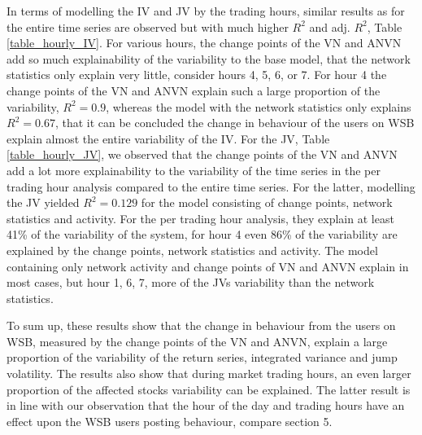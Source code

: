 In terms of modelling the IV and JV by the trading hours, similar results as for the entire time series are observed but with much higher $R^2$ and adj. $R^2$, Table \ref{table_hourly_IV}. For various hours, the change points of the VN and ANVN add so much explainability of the variability to the base model, that the network statistics only explain very little, consider hours 4, 5, 6, or 7. For hour 4 the change points of the VN and ANVN explain such a large proportion of the variability, $R^2 = 0.9$, whereas the model with the network statistics only explains $R^2 = 0.67$, that it can be concluded the change in behaviour of the users on WSB explain almost the entire variability of the IV. 
For the JV, Table \ref{table_hourly_JV}, we observed that the change points of the VN and ANVN add a lot more explainability to the variability of the time series in the per trading hour analysis compared to the entire time series. For the latter, modelling the JV yielded $R^2 = 0.129$ for the model consisting of change points, network statistics and activity. For the per trading hour analysis, they explain at least 41\% of the variability of the system, for hour 4 even 86\% of the variability are explained by the change points, network statistics and activity. The model containing only network activity and change points of VN and ANVN explain in most cases, but hour 1, 6, 7, more of the JVs variability than the network statistics. 

To sum up, these results show that the change in behaviour from the users on WSB, measured by the change points of the VN and ANVN, explain a large proportion of the variability of the return series, integrated variance and jump volatility. %
The results also show that during market trading hours, an even larger proportion of the affected stocks variability can be explained. The latter result is in line with our observation that the hour of the day and trading hours have an effect upon the WSB users posting behaviour, compare section 5. 




%